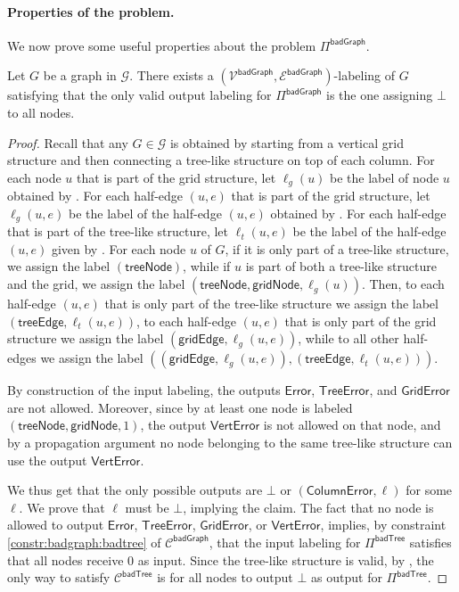 \documentclass[11pt]{article}
\newcommand{\lerror}{\mathsf {Error}}
\newcommand{\lgriderror}{\mathsf {GridError}}
\newcommand{\lverterror}{\mathsf {VertError}}
\newcommand{\ltreeerror}{\mathsf {TreeError}}
\newcommand{\lcolumnerror}{\mathsf {ColumnError}}
\newcommand{\lgridedge}{\mathsf {gridEdge}}
\newcommand{\lgridnode}{\mathsf {gridNode}}
\newcommand{\ltreenode}{\mathsf {treeNode}}
\newcommand{\ltreeedge}{\mathsf {treeEdge}}
\newcommand{\lbadtree}{\mathsf {badTree}}
\newcommand{\lbadgraph}{\mathsf {badGraph}}
\begin{document}
\paragraph{Properties of the problem.}
We now prove some useful properties about the problem $\Pi^{\lbadgraph}$.
\begin{lemma}\label{lem:badgraph-bot-everywhere}
	Let $G$ be a graph in $\mathcal{G}$. There exists a $(\mathcal{V^\lbadgraph},\mathcal{E^\lbadgraph})$-labeling of $G$ satisfying that the only valid output labeling for $\Pi^{\lbadgraph}$ is the one assigning $\bot$ to all nodes.
\end{lemma}
\begin{proof}
	Recall that any $G \in \mathcal{G}$ is obtained by starting from a vertical grid structure and then connecting a tree-like structure on top of each column. 
	For each node $u$ that is part of the grid structure, let $\ell_g(u)$ be the label of node $u$ obtained by . For each half-edge $(u,e)$ that is part of the grid structure, let $\ell_g(u,e)$ be the label of the half-edge $(u,e)$ obtained by . For each half-edge that is part of the tree-like structure, let $\ell_t(u,e)$ be the label of the half-edge $(u,e)$ given by . For each node $u$ of $G$, if it is only part of a tree-like structure, we assign the label $(\ltreenode)$, while if $u$ is part of both a tree-like structure and the grid, we assign the label $(\ltreenode,\lgridnode,\ell_g(u))$.
	Then, to each half-edge $(u,e)$ that is only part of the tree-like structure we assign the label $(\ltreeedge,\ell_t(u,e))$, to each half-edge $(u,e)$ that is only part of the grid structure we assign the label $(\lgridedge,\ell_g(u,e))$, while to all other half-edges we assign the label $((\lgridedge,\ell_g(u,e)),(\ltreeedge,\ell_t(u,e)))$.
	
	By construction of the input labeling, the outputs $\lerror$, $\ltreeerror$, and $\lgriderror$ are not allowed. Moreover, since by  at least one node is labeled $(\ltreenode,\lgridnode,1)$, the output $\lverterror$ is not allowed on that node, and by a propagation argument no node belonging to the same tree-like structure can use the output $\lverterror$. 
	
	We thus get that the only possible outputs are $\bot$ or $(\lcolumnerror,\ell)$ for some $\ell$. We prove that $\ell$ must be $\bot$, implying the claim.
	The fact that no node is allowed to output $\lerror$, $\ltreeerror$, $\lgriderror$, or $\lverterror$, implies, by constraint \ref{constr:badgraph:badtree} of $\mathcal{C}^{\lbadgraph}$, that the input labeling for $\Pi^{\lbadtree}$ satisfies that all nodes receive $0$ as input. Since the tree-like structure is valid, by , the only way to satisfy $\mathcal{C}^{\lbadtree}$ is for all nodes to output $\bot$ as output for $\Pi^{\lbadtree}$.
\end{proof}
\end{document}
